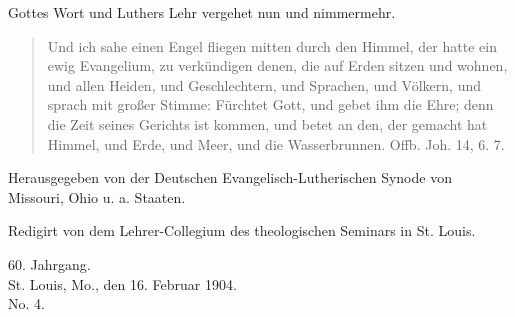 \begin{titelseite}

Gottes Wort und Luthers Lehr vergehet nun und nimmermehr.\\[1em]

\begin{quote}
Und ich sahe einen Engel fliegen mitten durch den Himmel, der hatte ein ewig Evangelium, zu verkündigen denen, die auf Erden sitzen und wohnen, und allen Heiden, und Geschlechtern, und Sprachen, und Völkern, und sprach mit großer Stimme: Fürchtet Gott, und gebet ihm die Ehre; denn die Zeit seines Gerichts ist kommen, und betet an den, der gemacht hat Himmel, und Erde, und Meer, und die Wasserbrunnen. Offb. Joh. 14, 6. 7.
\end{quote}


Herausgegeben von der Deutschen Evangelisch-Lutherischen Synode von Missouri, Ohio u. a. Staaten.

Redigirt von dem Lehrer-Collegium des theologischen Seminars in St. Louis.

60. Jahrgang.\\
St. Louis, Mo., den 16. Februar 1904.\\
No. 4.
\end{titelseite}
